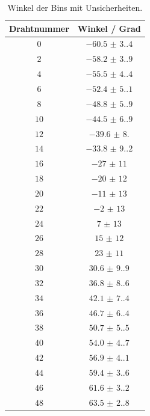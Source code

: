 \begin{table}[h]
\centering
\begin{tabular}{|c|c|} \hline
Drahtnummer & Winkel / Grad \\\hline
$0$ & $\num{-60.5(3.4)}$ \\
$2$ & $\num{-58.2(3.9)}$ \\
$4$ & $\num{-55.5(4.4)}$ \\
$6$ & $\num{-52.4(5.1)}$ \\
$8$ & $\num{-48.8(5.9)}$ \\
$10$ & $\num{-44.5(6.9)}$ \\
$12$ & $\num{-39.6(8.0)}$ \\
$14$ & $\num{-33.8(9.2)}$ \\
$16$ & $\num{-27(11)}$ \\
$18$ & $\num{-20(12)}$ \\
$20$ & $\num{-11(13)}$ \\
$22$ & $\num{-2(13)}$ \\
$24$ & $\num{7(13)}$ \\
$26$ & $\num{15(12)}$ \\
$28$ & $\num{23(11)}$ \\
$30$ & $\num{30.6(9.9)}$ \\
$32$ & $\num{36.8(8.6)}$ \\
$34$ & $\num{42.1(7.4)}$ \\
$36$ & $\num{46.7(6.4)}$ \\
$38$ & $\num{50.7(5.5)}$ \\
$40$ & $\num{54.0(4.7)}$ \\
$42$ & $\num{56.9(4.1)}$ \\
$44$ & $\num{59.4(3.6)}$ \\
$46$ & $\num{61.6(3.2)}$ \\
$48$ & $\num{63.5(2.8)}$ \\
\hline
\end{tabular}
\caption{Winkel der Bins mit Unsicherheiten.}
\label{tab:angle_bins}
\end{table}
